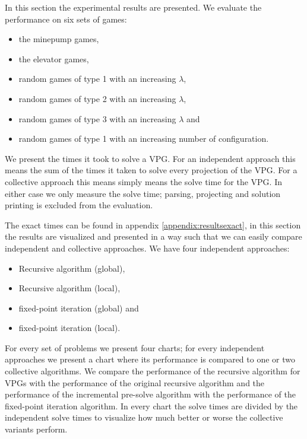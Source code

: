 In this section the experimental results are presented. We evaluate the performance on six sets of games:
\begin{itemize}
	\item the minepump games,
	\item the elevator games,
	\item random games of type 1 with an increasing $\lambda$,
	\item random games of type 2 with an increasing $\lambda$,
	\item random games of type 3 with an increasing $\lambda$ and
	\item random games of type 1 with an increasing number of configuration.
\end{itemize}

We present the times it took to solve a VPG. For an independent approach this means the sum of the times it taken to solve every projection of the VPG. For a collective approach this means simply means the solve time for the VPG. In either case we only measure the solve time; parsing, projecting and solution printing is excluded from the evaluation.

The exact times can be found in appendix \ref{appendix:resultsexact}, in this section the results are visualized and presented in a way such that we can easily compare independent and collective approaches. We have four independent approaches:
\begin{itemize}
	\item Recursive algorithm (global),
	\item Recursive algorithm (local),
	\item fixed-point iteration (global) and
	\item fixed-point iteration (local).
\end{itemize}
For every set of problems we present four charts; for every independent approaches we present a chart where its performance is compared to one or two collective algorithms. We compare the performance of the recursive algorithm for VPGs with the performance of the original recursive algorithm and the performance of the incremental pre-solve algorithm with the performance of the fixed-point iteration algorithm. In every chart the solve times are divided by the independent solve times to visualize how much better or worse the collective variants perform.

